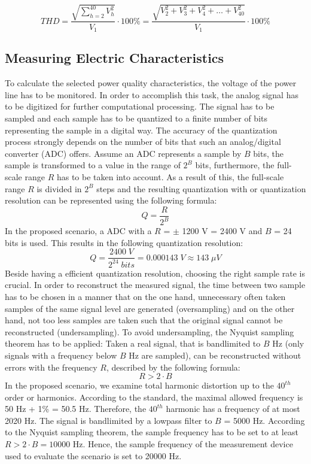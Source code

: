 \[ {THD} = \frac{\sqrt{\sum_{h=2}^{40} V_h^2}}{V_1} \cdot 100\% = \frac{\sqrt{V_2^2 + V_3^2 + V_4^2 + \dots + V_{40}^2}}{V_1} \cdot 100\% \]

\subsection{Measuring Electric Characteristics}

To calculate the selected power quality characteristics, the voltage of the power line has to be monitored. In order to accomplish this task, the analog signal has to be digitized for further computational processing. The signal has to be sampled and each sample has to be quantized to a finite number of bits representing the sample in a digital way. The accuracy of the quantization process strongly depends on the number of bits that such an analog/digital converter (ADC) offers. Assume an ADC represents a sample by $B$ bits, the sample is transformed to a value in the range of $2^B$ bits, furthermore, the full-scale range $R$ has to be taken into account. As a result of this, the full-scale range $R$ is divided in $2^B$ steps and the resulting quantization with or quantization resolution can be represented using the following formula\cite{sig_proc}:
\[ Q = \frac{R}{2^B} \]
\newline
In the proposed scenario, a ADC with a $R$ = $\pm$ 1200 V = 2400 V and $B$ = 24 bits is used. This results in the following quantization resolution:
\[ Q = \frac{2400 \; V}{2^{24} \; bits} = 0.000143 \; V \approx 143 \; \mu V \]
\newline
Beside having a efficient quantization resolution, choosing the right sample rate is crucial. In order to reconstruct the measured signal, the time between two sample has to be chosen in a manner that on the one hand, unnecessary often taken samples of the same signal level are generated (oversampling) and on the other hand, not too less samples are taken such that the original signal cannot be reconstructed (undersampling)\cite{sig_proc}. To avoid undersampling, the Nyquist sampling theorem has to be applied: Taken a real signal, that is bandlimited to $B$ Hz (only signals with a frequency below $B$ Hz are sampled), can be reconstructed without errors with the frequency $R$, described by the following formula\cite{sampling}:
\[R > 2 \cdot B\]
\newline
In the proposed scenario, we examine total harmonic distortion up to the $40^{th}$ order or harmonics. According to the standard, the maximal allowed frequency is 50 Hz + 1\% = 50.5 Hz. Therefore, the $40^{th}$ harmonic has a frequency of at most 2020 Hz. The signal is bandlimited by a lowpass filter to $B$ = 5000 Hz. According to the Nyquist sampling theorem, the sample frequency has to be set to at least $R > 2 \cdot B = 10000$ Hz. Hence, the sample frequency of the measurement device used to evaluate the scenario is set to 20000 Hz.

